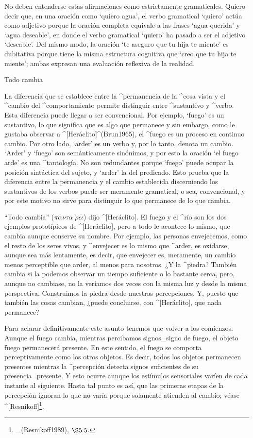 No deben entenderse estas afirmaciones como estrictamente gramaticales.
Quiero decir que, en una oración como `quiero agua', el verbo gramatical
`quiero' actúa como adjetivo porque la oración completa equivale a las
frases `agua querida' y `agua deseable', en donde el verbo gramatical
`quiero' ha pasado a ser el adjetivo `deseable'. Del mismo modo, la
oración `te aseguro que tu hija te miente' es dubitativa porque tiene la
misma estructura cognitiva que `creo que tu hija te miente'; ambas
expresan una evaluación reflexiva de la realidad.


\Section Todo cambia

La diferencia que se establece entre la ^{permanencia} de la ^{cosa}
vista y el ^{cambio} del ^{comportamiento} permite distinguir entre
^{sustantivo} y ^{verbo}. Esta diferencia puede llegar a ser
convencional. Por ejemplo, `fuego' es un sustantivo, lo que significa
que es algo que permanece y sin embargo, como le gustaba observar a
^[Heráclito]^(Brun1965), el ^{fuego} es un proceso en continuo cambio.
Por otro lado, `arder' es un verbo y, por lo tanto, denota un cambio.
`Arder' y `fuego' son semánticamente sinónimos, y por esto la oración
`el fuego arde' es una ^{tautología}. No son redundantes porque `fuego'
puede ocupar la posición sintáctica del sujeto, y `arder' la del
predicado. Esto prueba que la diferencia entre la permanencia y el
cambio establecida discerniendo los sustantivos de los verbos puede ser
meramente gramatical, o sea, convencional, y por este motivo no sirve
para distinguir lo que permanece de lo que cambia.

``Todo cambia''
 ($\pi\acute\alpha\nu\tau\alpha \; \acute\rho\epsilon\tilde\iota$)
dijo ^[Heráclito]. El fuego y el ^{río} son los dos ejemplos
prototípicos de ^[Heráclito], pero a todo le acontece lo mismo, que
cambia aunque conserve su nombre. Por ejemplo, las personas envejecemos,
como el resto de los seres vivos, y ^{envejecer} es lo mismo que
^{arder}, es oxidarse, aunque sea más lentamente, es decir, que
envejecer es, meramente, un cambio menos perceptible que arder, al menos
para nosotros. ¿Y la ^{piedra}? También cambia si la podemos observar un
tiempo suficiente o lo bastante cerca, pero, aunque no cambiase, no la
veríamos dos veces con la misma luz y desde la misma perspectiva.
Construimos la piedra desde nuestras percepciones. Y, puesto que también
las cosas cambian, ¿puede concluirse, con ^[Heráclito], que nada
permanece?

Para aclarar definitivamente este asunto tenemos que volver a los
comienzos. Aunque el fuego cambia, mientras percibamos signos_{signo} de
fuego, el objeto fuego permanecerá presente. En este sentido, el fuego
se comporta perceptivamente como los otros objetos. Es decir, todos los
objetos permanecen presentes mientras la ^{percepción} detecta signos
suficientes de su presencia_{presente}. Y esto ocurre aunque los
estímulos sensoriales varíen de cada instante al siguiente. Hasta tal
punto es así, que las primeras etapas de la percepción ignoran lo que no
varía porque solamente atienden al cambio; véase
^[Resnikoff]\footnote{_(Resnikoff1989), $\S5.5$.}.

